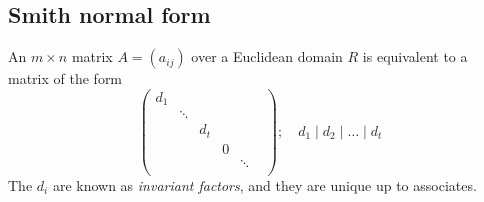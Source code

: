 \subsection{Smith normal form}
\begin{theorem}
	An \( m \times n \) matrix \( A = (a_{ij}) \) over a Euclidean domain \( R \) is equivalent to a matrix of the form
	\[ \begin{pmatrix}
		d_1 \\
		& \ddots \\
		& & d_t \\
		& & & 0 \\
		& & & & \ddots \\
		& & & & &
	\end{pmatrix};\quad d_1 \mid d_2 \mid \dots \mid d_t \]
	The \( d_i \) are known as \textit{invariant factors}, and they are unique up to associates.
\end{theorem}
